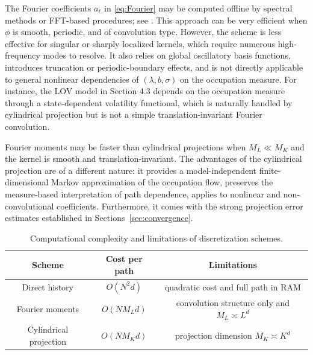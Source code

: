 \documentclass[11pt]{article}
\numberwithin{equation}{section}
\theoremstyle{plain}
\theoremstyle{definition}
\begin{document}
The Fourier
coefficients \(a_\ell\) in \eqref{eq:Fourier} may be computed offline by spectral methods or FFT-based
procedures; see \cite{Trefethen2000,Boyd2001,CooleyTukey1965}. This approach can be
very efficient when \(\phi\) is smooth, periodic, and of convolution type. However, the scheme is less effective for singular or sharply localized kernels, which require numerous high-frequency modes to resolve. 
It also relies on global oscillatory basis functions, introduces truncation
or periodic-boundary effects, and is not directly applicable to general nonlinear
dependencies of \((\lambda,b,\sigma)\) on the occupation measure. For instance, the LOV
model in Section 4.3 depends on the occupation measure through a state-dependent
volatility functional, which is naturally handled by cylindrical projection but is not a
simple translation-invariant Fourier convolution.


Fourier moments
may be faster than cylindrical projections when \(M_L\ll M_K\) and the kernel is smooth and
translation-invariant. The advantages of the cylindrical projection are of a different nature: it
provides a model-independent finite-dimensional Markov approximation of the occupation
flow, preserves the measure-based interpretation of  path dependence, applies to
nonlinear and non-convolutional coefficients. Furthermore, it  comes with the strong
projection error estimates established in Sections~\ref{sec:convergence}.




\begin{table}[htbp]
\centering
\caption{Computational complexity and limitations of discretization schemes.}
\label{tab:comparison}
\begin{tabular}{c|c|c}
\hline
\textbf{Scheme} & \textbf{Cost per path} & \textbf{Limitations} \\
\hline
Direct history         & $O(N^2d)$   & quadratic cost and full path in RAM \\
Fourier moments        & $O(NM_Ld)$    & convolution structure only and $M_L \asymp L^d$\\ %
Cylindrical projection & $O(NM_Kd)$  & projection dimension $M_K \asymp K^d$ \\
\hline
\end{tabular}
\end{table} 
\end{document}
